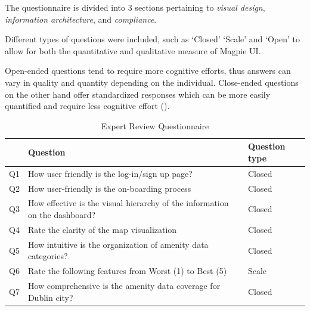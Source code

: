 The questionnaire is divided into 3 sections pertaining to \emph{visual design},
\emph{information architecture}, and \emph{compliance}.

Different types of questions were included, such as `Closed' `Scale' and `Open'
to allow for both the quantitative and qualitative measure of Magpie UI.

Open-ended questions tend to require more cognitive efforts, thus answers can
vary in quality and quantity depending on the individual. Close-ended questions
on the other hand offer standardized responses which can be more easily
quantified and require less cognitive effort (\cite{mixsurveyquestions2020}).
\begin{table}[h!]
    \centering
    \caption{Expert Review Questionnaire}
    \begin{tabular}{|p{}|p{}|p{}|}
        \hline
            & \textbf{Question}                                                                                                        & \textbf{Question type} \\
        \hline
        Q1  & How user friendly is the log-in/sign up page?                                                                            & Closed                 \\
        \hline
        Q2  & How user-friendly is the on-boarding process                                                                             & Closed                 \\
        \hline
        Q3  & How effective is the visual hierarchy of the information on the dashboard?                                               & Closed                 \\
        \hline
        Q4  & Rate the clarity of the map visualization                                                                                & Closed                 \\
        \hline
        Q5  & How intuitive is the organization of amenity data categories?                                                            & Closed                 \\
        \hline
        Q6  & Rate the following features from Worst (1) to Best (5)                                                                   & Scale                  \\
        \hline
        Q7  & How comprehensive is the amenity data coverage for Dublin city?                                                          & Closed                 \\

\end{tabular}
\end{table}
